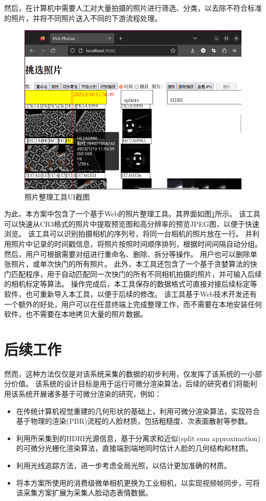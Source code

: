 然后，在计算机中需要人工对大量拍摄的照片进行筛选、分类，以去除不符合标准的照片，并将不同照片送入不同的下游流程处理。
\begin{figure}
\centering
\includegraphics[width=\textwidth]{figures/pick_photo}
\caption{照片整理工具UI截图}
\label{fig:pick_photo}
\end{figure}
为此，本方案中包含了一个基于Web的照片整理工具。其界面如图\ref{fig:pick_photo}所示。
该工具可以快速从CR3格式的照片中提取预览图和高分辨率的预览JPEG图，以便于快速浏览。
该工具可以识别拍摄相机的序列号，将同一台相机的照片放在一行。
并利用照片中记录的时间戳信息，将照片按照时间顺序排列，根据时间间隔自动分组。
然后，用户可根据需要对组进行重命名、删除、拆分等操作。
用户也可以删除单张照片，或单次快门的所有照片。
此外，本工具还包含了一个基于贪婪算法的快门匹配程序，用于自动匹配同一次快门的所有不同相机拍摄的照片，并可输入后续的相机标定等算法。
操作完成后，本工具保存的数据格式可直接对接后续标定等软件，也可重新导入本工具，以便于后续的修改。
该工具基于Web技术开发还有一个额外的好处，用户可以在任意终端上完成整理工作，而不需要在本地安装任何软件，也不需要在本地拷贝大量的照片数据。

\section{后续工作}

然而，这种方法仅仅是对该系统采集的数据的初步利用，仅发挥了该系统的一小部分价值。
该系统的设计目标是用于运行可微分渲染算法，后续的研究者们将能利用该系统开展诸多基于可微分渲染的研究，例如：
\begin{itemize}
\item 在传统计算机视觉重建的几何形状的基础上，利用可微分渲染算法，实现符合基于物理的渲染(PBR)流程的人脸材质，包括粗糙度、次表面散射等参数。
\item 利用所采集到的HDRI光源信息，基于分离求和近似(split sum approximation)的可微分光栅化渲染算法，直接端到端地同时估计人脸的几何结构和材质。
\item 利用光线追踪方法，进一步考虑全局光照，以估计更加准确的材质。
\item 将本方案所使用的消费级微单相机更换为工业相机，以实现视频帧同步，可将该采集方案扩展为采集人脸动态表情数据。
\end{itemize}

